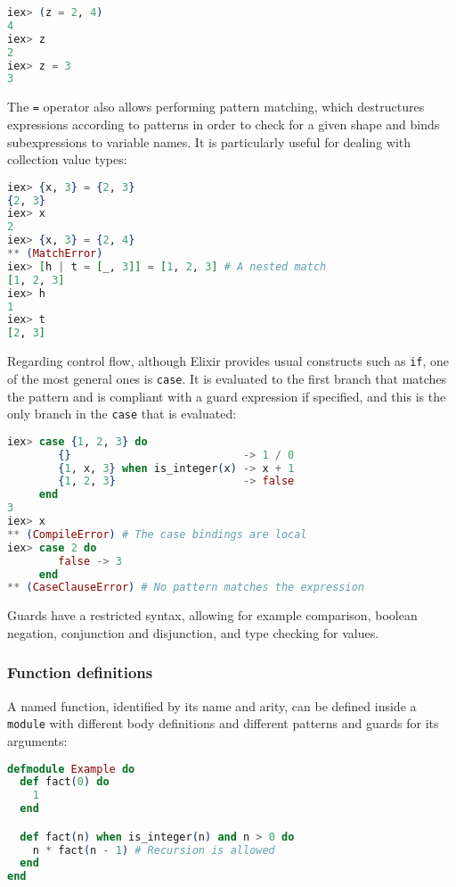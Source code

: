 \begin{lstlisting}[language=elixir,numbers=none,frame=none]
iex> (z = 2, 4)
4
iex> z
2
iex> z = 3
3
\end{lstlisting}

The \verb|=| operator also allows performing pattern matching, which
destructures expressions according to patterns in order to check for a given
shape and binds subexpressions to variable names. It is particularly useful for
dealing with collection value types:

\begin{lstlisting}[language=elixir,numbers=none,frame=none]
iex> {x, 3} = {2, 3}
{2, 3}
iex> x
2
iex> {x, 3} = {2, 4}
** (MatchError)
iex> [h | t = [_, 3]] = [1, 2, 3] # A nested match
[1, 2, 3]
iex> h
1
iex> t
[2, 3]
\end{lstlisting}

Regarding control flow, although Elixir provides usual constructs such as 
\verb|if|, one of the most general ones is \verb|case|. It is evaluated to the
first branch that matches the pattern and is compliant with a guard expression
if specified, and this is the only branch in the \verb|case| that is evaluated:

\begin{lstlisting}[language=elixir,numbers=none,frame=none]
iex> case {1, 2, 3} do 
        {}                           -> 1 / 0
        {1, x, 3} when is_integer(x) -> x + 1
        {1, 2, 3}                    -> false
     end
3
iex> x
** (CompileError) # The case bindings are local
iex> case 2 do 
        false -> 3 
     end 
** (CaseClauseError) # No pattern matches the expression
\end{lstlisting}

Guards have a restricted syntax, allowing for example comparison, boolean 
negation, conjunction and disjunction, and type checking for values.

\subsubsection{Function definitions}

A named function, identified by its name and arity, can be defined inside a
\verb|module| with different body definitions and different patterns and guards
for its arguments:

\begin{lstlisting}[language=elixir,numbers=none,frame=none]
defmodule Example do 
  def fact(0) do 
    1
  end

  def fact(n) when is_integer(n) and n > 0 do 
    n * fact(n - 1) # Recursion is allowed
  end
end
\end{lstlisting}

